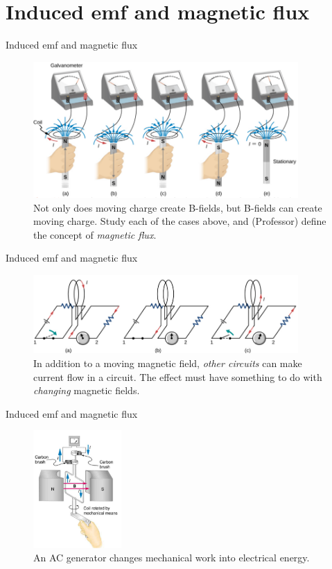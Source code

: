 \documentclass{beamer}
\begin{document}
\section{Induced emf and magnetic flux}

\begin{frame}{Induced emf and magnetic flux}
\begin{figure}
\centering
\includegraphics[width=0.9\textwidth]{figures/farad.png}
\caption{\label{fig:farad1} Not only does moving charge create B-fields, but B-fields can create moving charge.  Study each of the cases above, and (Professor) define the concept of \textit{magnetic flux}.}
\end{figure}
\end{frame}

\begin{frame}{Induced emf and magnetic flux}
\begin{figure}
\centering
\includegraphics[width=0.9\textwidth]{figures/farad2.png}
\caption{\label{fig:farad2} In addition to a moving magnetic field, \textit{other circuits} can make current flow in a circuit.  The effect must have something to do with \textit{changing} magnetic fields.}
\end{figure}
\end{frame}

\begin{frame}{Induced emf and magnetic flux}
\begin{figure}
\centering
\includegraphics[width=0.3\textwidth]{figures/motorz.png}
\caption{\label{fig:motorz} An AC generator changes mechanical work into electrical energy.}
\end{figure}
\end{frame}
\end{document}
